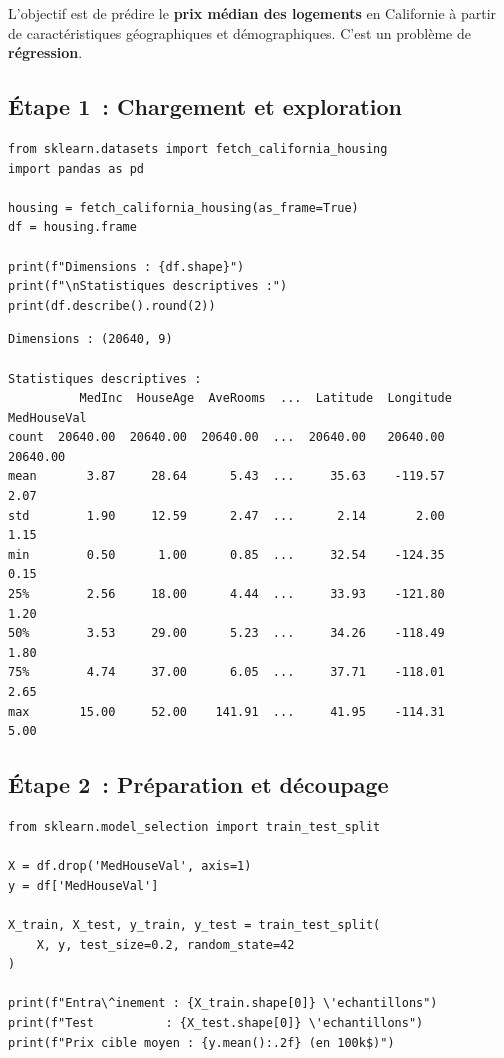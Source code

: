 L'objectif est de pr\'edire le \textbf{prix m\'edian des logements} en Californie \`a partir de caract\'eristiques g\'eographiques et d\'emographiques. C'est un probl\`eme de \textbf{r\'egression}.

\subsection{\'Etape 1~: Chargement et exploration}

\begin{codeblock}[title=\textbf{Python}]
\begin{verbatim}
from sklearn.datasets import fetch_california_housing
import pandas as pd

housing = fetch_california_housing(as_frame=True)
df = housing.frame

print(f"Dimensions : {df.shape}")
print(f"\nStatistiques descriptives :")
print(df.describe().round(2))
\end{verbatim}
\end{codeblock}

\begin{codeoutput}
\begin{verbatim}
Dimensions : (20640, 9)

Statistiques descriptives :
          MedInc  HouseAge  AveRooms  ...  Latitude  Longitude  MedHouseVal
count  20640.00  20640.00  20640.00  ...  20640.00   20640.00     20640.00
mean       3.87     28.64      5.43  ...     35.63    -119.57         2.07
std        1.90     12.59      2.47  ...      2.14       2.00         1.15
min        0.50      1.00      0.85  ...     32.54    -124.35         0.15
25%        2.56     18.00      4.44  ...     33.93    -121.80         1.20
50%        3.53     29.00      5.23  ...     34.26    -118.49         1.80
75%        4.74     37.00      6.05  ...     37.71    -118.01         2.65
max       15.00     52.00    141.91  ...     41.95    -114.31         5.00
\end{verbatim}
\end{codeoutput}

\subsection{\'Etape 2~: Pr\'eparation et d\'ecoupage}

\begin{codeblock}[title=\textbf{Python}]
\begin{verbatim}
from sklearn.model_selection import train_test_split

X = df.drop('MedHouseVal', axis=1)
y = df['MedHouseVal']

X_train, X_test, y_train, y_test = train_test_split(
    X, y, test_size=0.2, random_state=42
)

print(f"Entra\^inement : {X_train.shape[0]} \'echantillons")
print(f"Test          : {X_test.shape[0]} \'echantillons")
print(f"Prix cible moyen : {y.mean():.2f} (en 100k$)")
\end{verbatim}
\end{codeblock}

